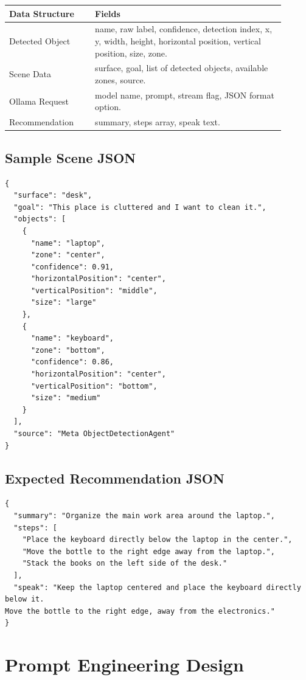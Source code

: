 \documentclass[12pt,a4paper]{article}
\begin{document}
\begin{longtable}{p{0.28\linewidth} p{0.62\linewidth}}
\toprule
\textbf{Data Structure} & \textbf{Fields}\\
\midrule
Detected Object & name, raw label, confidence, detection index, x, y, width, height, horizontal position, vertical position, size, zone.\\
Scene Data & surface, goal, list of detected objects, available zones, source.\\
Ollama Request & model name, prompt, stream flag, JSON format option.\\
Recommendation & summary, steps array, speak text.\\
\bottomrule
\end{longtable}

\subsection{Sample Scene JSON}

\begin{verbatim}
{
  "surface": "desk",
  "goal": "This place is cluttered and I want to clean it.",
  "objects": [
    {
      "name": "laptop",
      "zone": "center",
      "confidence": 0.91,
      "horizontalPosition": "center",
      "verticalPosition": "middle",
      "size": "large"
    },
    {
      "name": "keyboard",
      "zone": "bottom",
      "confidence": 0.86,
      "horizontalPosition": "center",
      "verticalPosition": "bottom",
      "size": "medium"
    }
  ],
  "source": "Meta ObjectDetectionAgent"
}
\end{verbatim}

\subsection{Expected Recommendation JSON}

\begin{verbatim}
{
  "summary": "Organize the main work area around the laptop.",
  "steps": [
    "Place the keyboard directly below the laptop in the center.",
    "Move the bottle to the right edge away from the laptop.",
    "Stack the books on the left side of the desk."
  ],
  "speak": "Keep the laptop centered and place the keyboard directly below it.
Move the bottle to the right edge, away from the electronics."
}
\end{verbatim}

\section{Prompt Engineering Design}
\end{document}
